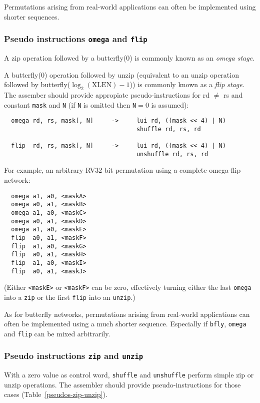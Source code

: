 Permutations arising from real-world applications can often be implemented using
shorter sequences.

\subsubsection{Pseudo instructions {\tt omega} and {\tt flip}}

A zip operation followed by a butterfly(0) is commonly known as an {\it omega stage}.

A butterfly(0) operation followed by unzip (equivalent to an unzip operation followed
by butterfly($\log_2(\textrm{XLEN})-1$)) is commonly
known as a {\it flip stage}. The assember should provide appropiate
pseudo-instructions for rd $\neq$ rs and constant {\tt mask} and {\tt N} (if {\tt N}
is omitted then {\tt N}$=$0 is assumed):

\begin{verbatim}
  omega rd, rs, mask[, N]     ->     lui rd, ((mask << 4) | N)
                                     shuffle rd, rs, rd

  flip  rd, rs, mask[, N]     ->     lui rd, ((mask << 4) | N)
                                     unshuffle rd, rs, rd
\end{verbatim}

For example, an arbitrary RV32 bit permutation using a complete omega-flip network:

\begin{verbatim}
  omega a1, a0, <maskA>
  omega a0, a1, <maskB>
  omega a1, a0, <maskC>
  omega a0, a1, <maskD>
  omega a1, a0, <maskE>
  flip  a0, a1, <maskF>
  flip  a1, a0, <maskG>
  flip  a0, a1, <maskH>
  flip  a1, a0, <maskI>
  flip  a0, a1, <maskJ>
\end{verbatim}

(Either {\tt <maskE>} or {\tt <maskF>} can be zero, effectively turning either
the last {\tt omega} into a {\tt zip} or the first {\tt flip} into an {\tt unzip}.)

As for butterfly networks, permutations arising from real-world applications
can often be implemented using a much shorter sequence. Especially if {\tt bfly},
{\tt omega} and {\tt flip} can be mixed arbitrarily.

\subsubsection{Pseudo instructions {\tt zip} and {\tt unzip}}

With a zero value as control word, {\tt shuffle} and {\tt unshuffle} perform
simple zip or unzip operations. The assembler should provide pseudo-instructions
for those cases (Table~\ref{pseudos-zip-unzip}).

